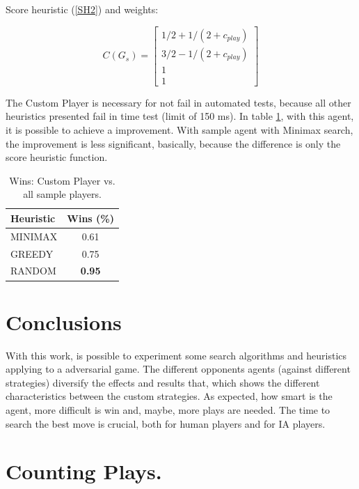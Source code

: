 \documentclass[a4paper]{article}
\begin{document}
    \item Score heuristic (\ref{SH2}) and weights:
    
    \begin{equation}
        C(G_s) =  \begin{bmatrix} 
        1/2+1/({2+c_{play}}) \\
        3/2-1/({2+c_{play}}) \\ 
                                  1 \\ 1 \end{bmatrix}  \label{C2}
    \end{equation}

The Custom Player is necessary for not fail in automated tests, because all other heuristics presented fail in time test (limit of 150 ms). In table \ref{tabwinsCP}, with this agent, it is possible to achieve a improvement. With sample agent with Minimax search, the improvement is less significant, basically, because the difference is only the score heuristic function.

\begin{table}[htpb]
    \caption{ Wins: Custom Player vs. all sample players.}
    \centering
    \begin{tabular}{ l | c }
    Heuristic & Wins (\%) \\ \hline 
    MINIMAX & 0.61 \\
    GREEDY & 0.75 \\
    RANDOM & \textbf{0.95} 
    \end{tabular}
    \label{tabwinsCP}
    \end{table}

\section{Conclusions}

With this work, is possible to experiment some search algorithms and heuristics applying to a adversarial game. The different opponents agents (against different strategies) diversify the effects and results that, which shows the different characteristics between the custom strategies. As expected, how smart is the agent, more difficult is win and, maybe, more plays are needed. The time to search the best move is crucial, both for human players and for IA players.




\appendix
\section{Counting Plays.}
\end{document}
